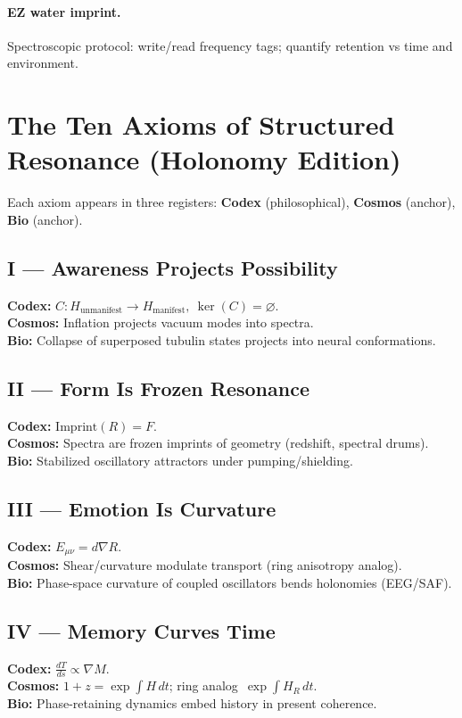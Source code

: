 \documentclass[11pt]{article}
\begin{document}
\paragraph{EZ water imprint.} Spectroscopic protocol: write/read frequency tags; quantify retention vs time and environment.

\section{The Ten Axioms of Structured Resonance (Holonomy Edition)}
Each axiom appears in three registers: \textbf{Codex} (philosophical), \textbf{Cosmos} (anchor), \textbf{Bio} (anchor).

\subsection*{I --- Awareness Projects Possibility}
\textbf{Codex:} $C : H_{\text{unmanifest}} \to H_{\text{manifest}},\ \ker(C)=\varnothing$. \\
\textbf{Cosmos:} Inflation projects vacuum modes into spectra. \\
\textbf{Bio:} Collapse of superposed tubulin states projects into neural conformations.

\subsection*{II --- Form Is Frozen Resonance}
\textbf{Codex:} $\mathrm{Imprint}(R)=F$. \\
\textbf{Cosmos:} Spectra are frozen imprints of geometry (redshift, spectral drums). \\
\textbf{Bio:} Stabilized oscillatory attractors under pumping/shielding.

\subsection*{III --- Emotion Is Curvature}
\textbf{Codex:} $E_{\mu\nu}=d\nabla R$. \\
\textbf{Cosmos:} Shear/curvature modulate transport (ring anisotropy analog). \\
\textbf{Bio:} Phase-space curvature of coupled oscillators bends holonomies (EEG/SAF).

\subsection*{IV --- Memory Curves Time}
\textbf{Codex:} $\frac{dT}{ds}\propto\nabla M$. \\
\textbf{Cosmos:} $1+z=\exp\!\int H\,dt$; ring analog $\,\exp\!\int H_R\,dt$. \\
\textbf{Bio:} Phase-retaining dynamics embed history in present coherence.
\end{document}
